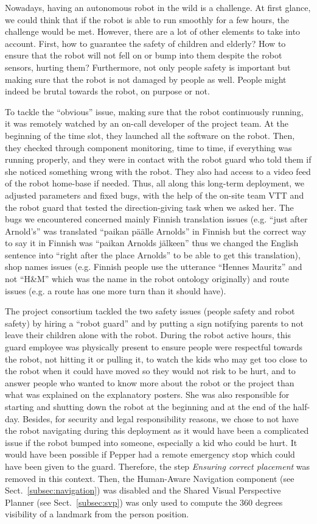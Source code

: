 \documentclass[a4paper,11pt,twoside]{StyleThese}
\begin{document}
Nowadays, having an autonomous robot in the wild is a challenge. At first glance, we could think that if the robot is able to run smoothly for a few hours, the challenge would be met. However, there are a lot of other elements to take into account. First, how to guarantee the safety of children and elderly? How to ensure that the robot will not fell on or bump into them despite the robot sensors, hurting them? Furthermore, not only people safety is important but making sure that the robot is not damaged by people as well. People might indeed be brutal towards the robot, on purpose or not. 

To tackle the ``obvious'' issue, making sure that the robot continuously running, it was remotely watched by an on-call developer of the project team. At the beginning of the time slot, they launched all the software on the robot. Then, they checked through component monitoring, time to time, if everything was running properly, and they were in contact with the robot guard who told them if she noticed something wrong with the robot. They also had access to a video feed of the robot home-base if needed. Thus, all along this long-term deployment, we adjusted parameters and fixed bugs, with the help of the on-site team VTT and the robot guard that tested the direction-giving task when we asked her. The bugs we encountered concerned mainly Finnish translation issues (e.g. ``just after Arnold's'' was translated ``paikan päälle Arnolds'' in Finnish but the correct way to say it in Finnish was ``paikan Arnolds jälkeen'' thus we changed the English sentence into ``right after the place Arnolds'' to be able to get this translation), shop names issues (e.g. Finnish people use the utterance ``Hennes Mauritz'' and not ``H\&M'' which was the name in the robot ontology originally) and route issues (e.g. a route has one more turn than it should have).

The project consortium tackled the two safety issues (people safety and robot safety) by hiring a ``robot guard'' and by putting a sign notifying parents to not leave their children alone with the robot. During the robot active hours, this guard employee was physically present to ensure people were respectful towards the robot, \ie not hitting it or pulling it, to watch the kids who may get too close to the robot when it could have moved so they would not risk to be hurt, and to answer people who wanted to know more about the robot or the project than what was explained on the explanatory posters. She was also responsible for starting and shutting down the robot at the beginning and at the end of the half-day. Besides, for security and legal responsibility reasons, we chose to not have the robot navigating during this deployment as it would have been a complicated issue if the robot bumped into someone, especially a kid who could be hurt. It would have been possible if Pepper had a remote emergency stop which could have been given to the guard. Therefore, the step \textit{Ensuring correct placement} was removed in this context. Then, the Human-Aware Navigation component (see Sect.~\ref{subsec:navigation}) was disabled and the Shared Visual Perspective Planner (see Sect.~\ref{subsec:svp}) was only used to compute the 360 degrees visibility of a landmark from the person position.
\end{document}
